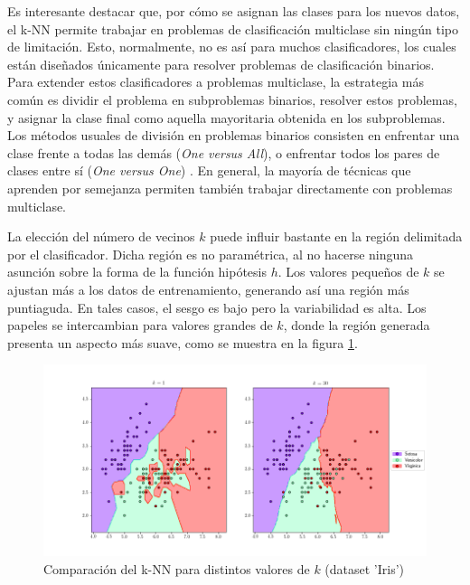 Es interesante destacar que, por cómo se asignan las clases para los nuevos datos, el k-NN permite trabajar en problemas de clasificación multiclase sin ningún tipo de limitación. Esto, normalmente, no es así para muchos clasificadores, los cuales están diseñados únicamente para resolver problemas de clasificación binarios. Para extender estos clasificadores a problemas multiclase, la estrategia más común es dividir el problema en subproblemas binarios, resolver estos problemas, y asignar la clase final como aquella mayoritaria obtenida en los subproblemas. Los métodos usuales de división en problemas binarios consisten en enfrentar una clase frente a todas las demás (\emph{One versus All}), o enfrentar todos los pares de clases entre sí (\emph{One versus One}) \cite{ovoova}. En general, la mayoría de técnicas que aprenden por semejanza permiten también trabajar directamente con problemas multiclase.

La elección del número de vecinos $k$ puede influir bastante en la región delimitada por el clasificador. Dicha región es no paramétrica, al no hacerse ninguna asunción sobre la forma de la función hipótesis $h$. Los valores pequeños de $k$  se ajustan más a los datos de entrenamiento, generando así una región más puntiaguda. En tales casos, el sesgo es bajo pero la variabilidad es alta. Los papeles se intercambian para valores grandes de $k$, donde la región generada presenta un aspecto más suave, como se muestra en la figura \ref{fig:knn_comp_k}.

\begin{figure}[h]
    \centering
    \includegraphics[width=\textwidth]{./images/compare_knn.png}
    \caption{Comparación del k-NN para distintos valores de $k$ (dataset 'Iris')} \label{fig:knn_comp_k}
\end{figure}

